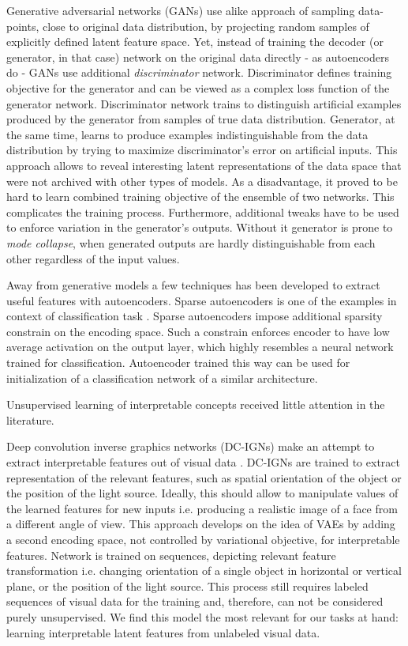 Generative adversarial networks (GANs) \cite{Goodfellow2014} use alike approach of sampling data-points, close to original data distribution, by projecting random samples of explicitly defined latent feature space.
Yet, instead of training the decoder (or generator, in that case) network on the original data directly - as autoencoders do - GANs use additional \textit{discriminator} network.
Discriminator defines training objective for the generator and can be viewed as a complex loss function of the generator network.
Discriminator network trains to distinguish artificial examples produced by the generator from samples of true data distribution.
Generator, at the same time, learns to produce examples indistinguishable from the data distribution by trying to maximize discriminator's error on artificial inputs.
This approach allows to reveal interesting latent representations of the data space that were not archived with other types of models.
As a disadvantage, it proved to be hard to learn combined training objective of the ensemble of two networks.
This complicates the training process.
Furthermore, additional tweaks have to be used to enforce variation in the generator's outputs.
Without it generator is prone to \textit{mode collapse}, when generated outputs are hardly distinguishable from each other regardless of the input values.

Away from generative models a few techniques has been developed to extract useful features with autoencoders.
Sparse autoencoders is one of the examples in context of classification task \cite{Ng2011, Makhzani2013, Masci2011}.
Sparse autoencoders impose additional sparsity constrain on the encoding space.
Such a constrain enforces encoder to have low average activation on the output layer, which highly resembles a neural network trained for classification.
Autoencoder trained this way can be used for initialization of a classification network of a similar architecture.

Unsupervised learning of interpretable concepts received little attention in the literature.

Deep convolution inverse graphics networks (DC-IGNs) make an attempt to extract interpretable features out of visual data \cite{Kulkarni2015}.
DC-IGNs are trained to extract representation of the relevant features, such as spatial orientation of the object or the position of the light source.
Ideally, this should allow to manipulate values of the learned features for new inputs i.e. producing a realistic image of a face from a different angle of view.
This approach develops on the idea of VAEs by adding a second encoding space, not controlled by variational objective, for interpretable features.
Network is trained on sequences, depicting relevant feature transformation i.e. changing orientation of a single object in horizontal or vertical plane, or the position of the light source.
This process still requires labeled sequences of visual data for the training and, therefore, can not be considered purely unsupervised.
We find this model the most relevant for our tasks at hand: learning interpretable latent features from unlabeled visual data.

